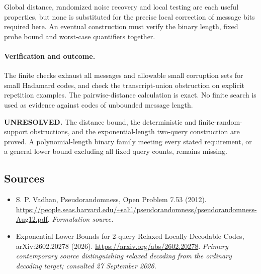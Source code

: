 \documentclass[11pt]{article}
\begin{document}
Global distance, randomized noise recovery and local testing are each useful properties, but none is substituted for the precise local correction of message bits required here. An eventual construction must verify the binary length, fixed probe bound and worst-case quantifiers together.

\paragraph{Verification and outcome.}
The finite checks exhaust all messages and allowable small corruption sets for small Hadamard codes, and check the transcript-union obstruction on explicit repetition examples. The pairwise-distance calculation is exact. No finite search is used as evidence against codes of unbounded message length.

\textbf{UNRESOLVED.} The distance bound, the deterministic and finite-random-support obstructions, and the exponential-length two-query construction are proved. A polynomial-length binary family meeting every stated requirement, or a general lower bound excluding all fixed query counts, remains missing.

\subsection{Sources}
\begin{itemize}
\item[S1]S. P. Vadhan, Pseudorandomness, Open Problem 7.53 (2012).
\url{https://people.seas.harvard.edu/~salil/pseudorandomness/pseudorandomness-Aug12.pdf}.
\textit{Formulation source.}
\item[E1]Exponential Lower Bounds for 2-query Relaxed Locally Decodable Codes, arXiv:2602.20278 (2026).
\url{https://arxiv.org/abs/2602.20278}.
\textit{Primary contemporary source distinguishing relaxed decoding from the ordinary decoding target; consulted 27 September 2026.}
\end{itemize}
\end{document}
